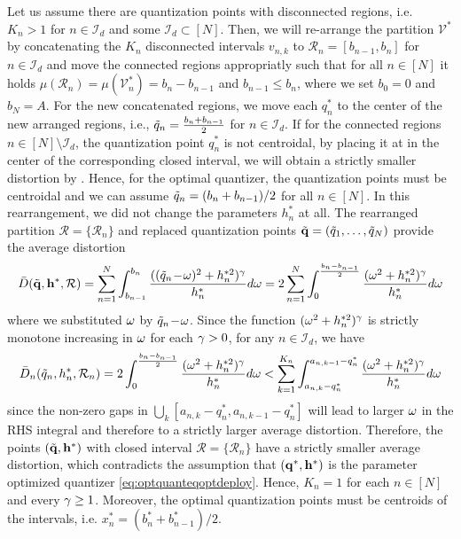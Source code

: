 \documentclass[12pt,onecolumn,journal,draftclsnofoot,letterpaper]{IEEEtran}
\newcommand{\Ind}{\mathcal{I}}
\renewcommand{\vp}{\mathbf q}
\newcommand{\Vor}{\ensuremath{\mathcal{V}}}         %
\newcommand{\Rset}{\ensuremath{\mathcal R}}
\newcommand{\Dis}{\ensuremath{D}}                    %
\newcommand{\AvDis}{\ensuremath{\bar{\Dis}}}         %
\begin{document}
  Let us assume there are quantization points with disconnected regions, i.e. $K_n>1$ for $n\in\Ind_d$ and some
  $\Ind_d\subset[N]$. Then, we will re-arrange the partition $\Vor^*$ by concatenating the $K_n$ disconnected
  intervals $v_{n,k}$ to $\Rset_n=[b_{n-1},b_{n}]$ for $n\in\Ind_d$ and move the connected regions appropriatly such that
  for all $n\in[N]$ it holds $\mu(\Rset_n)=\mu(\Vor^*_n)=b_n-b_{n-1}$ and $b_{n-1}\leq b_{n}$, where we set $b_0=0$ and
  $b_N=A$. For the new concatenated regions, we move each $q_n^*$ to the center of the new arranged regions, i.e.,
  $\tilde{q}_n=\frac{b_n+b_{n-1}}{2}$ for $n\in\Ind_d$. If for the connected regions $n\in[N]\setminus\Ind_d$, the
  quantization point $q^*_n$ is not centroidal, by placing it at in the center of the corresponding closed interval,
  we will obtain a strictly smaller distortion by . Hence, for the optimal quantizer, the quantization
  points must be centroidal and we can assume $\tilde{q}_n=(b_n+b_{n-1})/2$ for all $n\in[N]$. 
  In this rearrangement, we did not change the parameters $h_n^*$ at all.  The rearranged partition
  $\Rset=\{\Rset_n\}$ and replaced quantization points $\tvp=(\tq_1,\dots,\tq_N)$ provide the average distortion 
  \begin{align}
    \AvDis(\tvp,\vh^*,\Rset)=\sum_{n=1}^N \int_{b_{n-1}}^{b_n} \frac{ ((\tq_n\!-\!\ome)^2+h_n^{*2})^{\gam}}{h_n^{*}} d\ome
      = 2\sum_{n=1}^N \int_{0}^{\frac{b_n-b_{n-1}}{2}} \frac{ (\ome^2+h_n^{*2})^{\gam}}{h_n^{*}} d\ome
  \end{align}
  where we substituted $\omega$ by $\tilde{q}_n\!-\!\omega$. Since the function
  $(\omega^2+h_n^{*2})^{\gamma}$ is strictly monotone increasing in $\omega$ for each $\gamma>0$, for any $n\in\Ind_d$, we have
  \begin{align}
   \AvDis_n(\tq_n,h_n^*,\Rset_n)=    2\int_{0}^{\frac{b_n-b_{n-1}}{2}} \frac{ (\ome^2+h_n^{*2})^{\gam}}{h_n^{*}} d\ome 
    < \sum_{k=1}^{K_n}\int_{a_{n,k}-q_n^*}^{a_{n,k-1}-q_n^*} \frac{ (\ome^2+h_n^{*2})^{\gam}}{h_n^{*}}
    d\ome\label{eq:Avdisn}
  \end{align}
  since the non-zero gaps in $\bigcup_k [a_{n,k}-q_n^*,a_{n,k-1}-q_n^*]$ will lead to larger $\omega$ in the RHS integral
  and therefore to a strictly larger average distortion.  Therefore, the points $(\tvp,\vh^*)$ with closed interval
  $\Rset=\{\Rset_n\}$ have a strictly smaller average distortion, which contradicts the assumption that $(\vp^*,\vh^*)$ is the
  parameter optimized quantizer \eqref{eq:optquanteqoptdeploy}. Hence, $K_n=1$ for each $n\in[N]$ and every $\gamma\geq 1$.
  Moreover, the optimal quantization points must be centroids of the intervals, i.e. $x_n^*=(b_n^*+b^*_{n-1})/2$.
\end{document}
